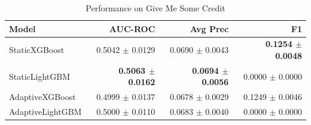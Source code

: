 \begin{table}[ht]
\centering
\caption{Performance on Give Me Some Credit}
\label{tab:results_gmsc}
\begin{tabular}{lrrr}
\hline
Model & AUC-ROC & Avg Prec & F1 \\
\hline
StaticXGBoost & 0.5042 $\pm$ 0.0129 & 0.0690 $\pm$ 0.0043 & \textbf{0.1254 $\pm$ 0.0048} \\
StaticLightGBM & \textbf{0.5063 $\pm$ 0.0162} & \textbf{0.0694 $\pm$ 0.0056} & 0.0000 $\pm$ 0.0000 \\
AdaptiveXGBoost & 0.4999 $\pm$ 0.0137 & 0.0678 $\pm$ 0.0029 & 0.1249 $\pm$ 0.0046 \\
AdaptiveLightGBM & 0.5000 $\pm$ 0.0110 & 0.0683 $\pm$ 0.0040 & 0.0000 $\pm$ 0.0000 \\
\hline
\end{tabular}
\end{table}